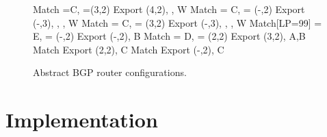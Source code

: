 \documentclass{sig-alternate-10pt}
\begin{document}
\begin{figure}[t!]
\begin{code}
    Match \PEER=C, \COMM=(3,2)
      Export \COMM \Arrow (4,2), \MED {}, \PEER \Arrow W
    Match \PEER = C, \COMM = (-,2)
      Export \COMM \Arrow (-,3), \COMM \Arrow {},
             \MED {}, \PEER \Arrow W
    Match \PEER = C, \COMM = (3,2)
      Export \COMM \Arrow (-,3), \COMM \Arrow {},
             \MED {}, \PEER \Arrow W
    Match[LP=99] \PEER = E, \COMM = (-,2) 
      Export \COMM \Arrow (-,2), \PEER \Arrow B
    Match \PEER = D, \COMM = (2,2)
      Export \COMM \Arrow (3,2), \PEER \Arrow A,B
    Match 
      Export \COMM \Arrow (2,2), \PEER \Arrow C
    Match 
      Export \COMM \Arrow (-,2), \PEER \Arrow C
  \end{code}
  \vspace{-2em} 
  \caption{Abstract BGP router configurations. \label{fig:abgp-config}}
  \vspace{-1em}
\end{figure}




%
%
%
%

\section{Implementation}
\label{sec:implementation}
\end{document}

